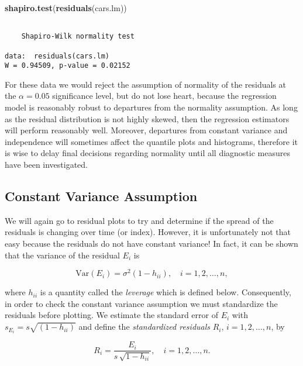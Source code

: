 \documentclass[]{book}
\newenvironment{Shaded}{\begin{snugshade}}{\end{snugshade}}
\newcommand{\KeywordTok}[1]{\textcolor[rgb]{0.13,0.29,0.53}{\textbf{{#1}}}}
\newcommand{\NormalTok}[1]{{#1}}
\numberwithin{equation}{chapter}
\numberwithin{figure}{chapter}
\theoremstyle{plain}
\theoremstyle{definition}
\theoremstyle{remark}
\theoremstyle{definition}
\theoremstyle{definition}
\theoremstyle{remark}
\begin{document}
\begin{Shaded}
\begin{Highlighting}[]
\KeywordTok{shapiro.test}\NormalTok{(}\KeywordTok{residuals}\NormalTok{(cars.lm))}
\end{Highlighting}
\end{Shaded}

\begin{verbatim}

    Shapiro-Wilk normality test

data:  residuals(cars.lm)
W = 0.94509, p-value = 0.02152
\end{verbatim}

For these data we would reject the assumption of normality of the
residuals at the \(\alpha=0.05\) significance level, but do not lose
heart, because the regression model is reasonably robust to departures
from the normality assumption. As long as the residual distribution is
not highly skewed, then the regression estimators will perform
reasonably well. Moreover, departures from constant variance and
independence will sometimes affect the quantile plots and histograms,
therefore it is wise to delay final decisions regarding normality until
all diagnostic measures have been investigated.

\subsection{Constant Variance
Assumption}\label{sub-constant-variance-assumption}

We will again go to residual plots to try and determine if the spread of
the residuals is changing over time (or index). However, it is
unfortunately not that easy because the residuals do not have constant
variance! In fact, it can be shown that the variance of the residual
\(E_{i}\) is

\begin{equation}
\mbox{Var$(E_{i})$}=\sigma^{2}(1-h_{ii}),\quad i=1,2,\ldots,n,
\end{equation}

where \(h_{ii}\) is a quantity called the \emph{leverage} which is
defined below. Consequently, in order to check the constant variance
assumption we must standardize the residuals before plotting. We
estimate the standard error of \(E_{i}\) with
\(s_{E_{i}}=s\sqrt{(1-h_{ii})}\) and define the \emph{standardized
residuals} \(R_{i}\), \(i=1,2,\ldots,n\), by

\begin{equation} 
R_{i}=\frac{E_{i}}{s\,\sqrt{1-h_{ii}}},\quad i=1,2,\ldots,n.
\end{equation}
\end{document}
